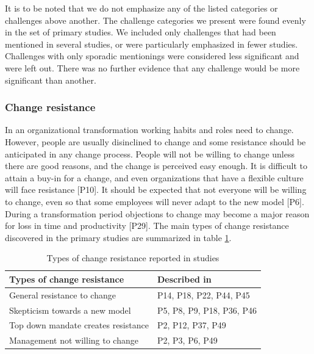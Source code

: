 It is to be noted that we do not emphasize any of the listed categories or
challenges above another. The challenge categories we present were found evenly
in the set of primary studies. We included only challenges that had been
mentioned in several studies, or were particularly emphasized in fewer studies.
Challenges with only sporadic mentionings were considered less significant and
were left out. There was no further evidence that any challenge would be more
significant than another.


\subsubsection{Change resistance}

In an organizational transformation working habits and roles need to change.
However, people are usually disinclined to change and some resistance should be
anticipated in any change process. People will not be willing to change unless
there are good reasons, and the change is perceived easy enough. It is difficult
to attain a buy-in for a change, and even organizations that have a flexible
culture will face resistance [P10]. It should be expected that not everyone will
be willing to change, even so that some employees will never adapt to the new
model [P6]. During a transformation period objections to change may become a
major reason for loss in time and productivity [P29]. The main types of change
resistance discovered in the primary studies are summarized in table
\ref{table:challenges_changeresistance}.

\begin{table}[b]
    \centering
    \begin{tabular}{ l l }
        \toprule
        Types of change resistance           &  Described in  \\
        \midrule
        General resistance to change         &  P14, P18, P22, P44, P45   \\
        Skepticism towards a new model       &  P5, P8, P9, P18, P36, P46 \\
        Top down mandate creates resistance  &  P2, P12, P37, P49 \\
        Management not willing to change     &  P2, P3, P6, P49 \\
        \bottomrule
    \end{tabular}
    \caption{Types of change resistance reported in studies}
    \label{table:challenges_changeresistance}
\end{table}

